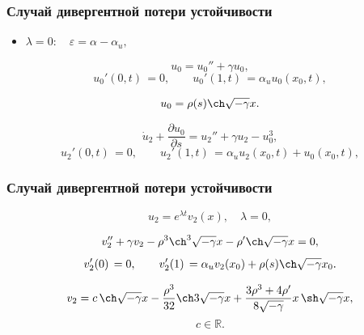 \documentclass[fullscreen=true, unicode, bookmarks=false]{beamer}
\begin{document}
\begin{frame}
\frametitle{ Случай дивергентной потери устойчивости }

\begin{itemize}
\item { $ \lambda = 0: \quad \varepsilon=\alpha-\alpha_u, $
}
\end{itemize}

\medskip

\begin{equation}
	u_0 = u_0'' + \gamma u_0,
\end{equation}
\begin{equation}
	u_0'(0, t) \, = 0, \qquad u_0'(1, t) \, = \alpha_u u_0(x_0, t),
\end{equation}

$$ u_0 = \rho(s) \ch \sqrt{-\gamma} x. $$

\medskip

\begin{equation}
	\dot u_2 + \frac{\partial u_0}{\partial s} = u_2'' + \gamma u_2 - u_0^3,
\end{equation}
\begin{equation}
	u_2'(0, t) \, = 0, \qquad u_2'(1, t) \, = \alpha_u u_2(x_0, t) + u_0(x_0, t),
\end{equation}

\end{frame}

\begin{frame}
\frametitle{ Случай дивергентной потери устойчивости }

$$ u_2 = e^{\lambda t}v_2(x), \quad \lambda = 0, $$

\medskip
\pause

\begin{equation}
	v_2'' + \gamma v_2 - \rho^3 \ch^3 \sqrt{-\gamma} x - \rho' \ch \sqrt{-\gamma} x = 0,
\end{equation}
\begin{equation}
	v_2'(0) \, = 0, \qquad v_2'(1) \, = \alpha_u v_2(x_0) + \rho(s) \ch \sqrt{-\gamma} x_0.
\end{equation}

\medskip
\pause

$$ v_2 = c \, \ch \sqrt{-\gamma} x - \frac{\rho^3}{32} \ch 3\sqrt{-\gamma} x + \frac{3\rho^3 + 4\rho'}{8\sqrt{-\gamma}} x \, \sh \sqrt{-\gamma} x, $$
$$ c \in \mathbb{R}. $$

\end{frame}
\end{document}
